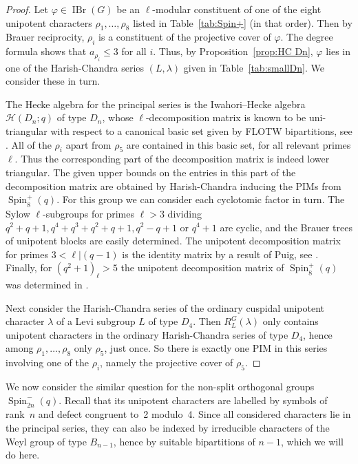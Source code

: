 \documentclass[12pt,leqno,a4paper]{amsart}
\newcommand{\cH}{{\mathcal{H}}}
\newcommand{\IBr}{{\operatorname{IBr}}}
\newcommand{\Spin}{{\operatorname{Spin}}}
\newcommand\RLG{{R_L^G}}
\let\la=\lambda
\let\vhi=\varphi
\theoremstyle{remark}
\begin{document}
\begin{proof}
Let $\vhi\in\IBr(G)$ be an $\ell$-modular constituent of one of the eight
unipotent characters $\rho_1,\ldots,\rho_8$ listed in Table~\ref{tab:Spin+}
(in that order). Then by Brauer reciprocity, $\rho_i$ is a constituent of the
projective cover of $\vhi$. The degree formula \cite[\S13.8]{Ca} shows that
$a_{\rho_i}\le3$ for all $i$. Thus, by Proposition~\ref{prop:HC Dn}, $\vhi$
lies in one of the Harish-Chandra series $(L,\la)$ given in
Table~\ref{tab:smallDn}. We consider these in turn.
\par
The Hecke algebra for the principal series is the Iwahori--Hecke algebra
$\cH(D_n;q)$ of type $D_n$, whose $\ell$-decomposition
matrix is known to be uni-triangular with respect to a canonical basic set
given by FLOTW bipartitions, see \cite[Thm.~5.8.19]{GJ11}. All of the $\rho_i$
apart from $\rho_5$ are contained
in this basic set, for all relevant primes $\ell$. Thus the corresponding part
of the decomposition matrix is indeed lower triangular. The given upper bounds
on the entries in this part of the decomposition matrix are obtained by
Harish-Chandra inducing the PIMs from $\Spin_8^+(q)$.
For this group we can consider each cyclotomic factor in turn. The Sylow
$\ell$-subgroups for primes $\ell>3$ dividing $q^2+q+1,q^4+q^3+q^2+q+1,q^2-q+1$
or $q^4+1$ are cyclic, and the Brauer trees of unipotent blocks are easily
determined. The unipotent decomposition matrix for primes $3<\ell|(q-1)$ is
the identity matrix by a result of Puig, see \cite[Thm.~23.12]{CE}. Finally,
for $(q^2+1)_\ell>5$ the unipotent decomposition matrix of $\Spin_8^+(q)$ was
determined in \cite[Thm.~3.3]{DM16}.  \par
Next consider the Harish-Chandra series of the ordinary cuspidal unipotent
character $\la$ of a Levi subgroup $L$ of type $D_4$. Then $\RLG(\la)$
only contains unipotent characters in the ordinary Harish-Chandra series of
type $D_4$, hence among $\rho_1,\ldots,\rho_8$ only $\rho_5$, just once.
So there is exactly one PIM in this series involving one of the $\rho_i$,
namely the projective cover of $\rho_5$.
\end{proof}

We now consider the similar question for the non-split orthogonal groups
$\Spin_{2n}^-(q)$. Recall that its unipotent characters are labelled by
symbols of rank~$n$ and defect congruent to~2 modulo~4. Since all considered
characters lie in the principal series, they can also be indexed by
irreducible characters of the Weyl group of type $B_{n-1}$, hence by suitable
bipartitions of $n-1$, which we will do here.
\end{document}
